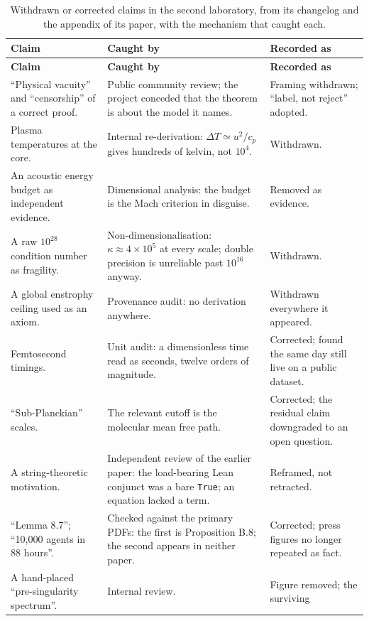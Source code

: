 \documentclass[11pt]{article}
\begin{document}
\begin{center}
\small
\begin{longtable}{@{}p{5.2cm}p{4.6cm}p{5.2cm}@{}}
\caption{Withdrawn or corrected claims in the second laboratory, from its changelog and the
appendix of its paper, with the mechanism that caught each.}\label{tab:sister}\\
\toprule
\textbf{Claim} & \textbf{Caught by} & \textbf{Recorded as} \\
\midrule
\endfirsthead
\toprule
\textbf{Claim} & \textbf{Caught by} & \textbf{Recorded as} \\
\midrule
\endhead
``Physical vacuity'' and ``censorship'' of a correct proof. & Public community review; the
project conceded that the theorem is about the model it names. & Framing withdrawn; ``label,
not reject'' adopted. \\
Plasma temperatures at the core. & Internal re-derivation: $\Delta T\simeq u^2/c_p$ gives
hundreds of kelvin, not $10^4$. & Withdrawn. \\
An acoustic energy budget as independent evidence. & Dimensional analysis: the budget is the
Mach criterion in disguise. & Removed as evidence. \\
A raw $10^{28}$ condition number as fragility. & Non-dimensionalisation: $\kappa\approx
4\times10^{5}$ at every scale; double precision is unreliable past $10^{16}$ anyway. &
Withdrawn. \\
A global enstrophy ceiling used as an axiom. & Provenance audit: no derivation anywhere. &
Withdrawn everywhere it appeared. \\
Femtosecond timings. & Unit audit: a dimensionless time read as seconds, twelve orders of
magnitude. & Corrected; found the same day still live on a public dataset. \\
``Sub-Planckian'' scales. & The relevant cutoff is the molecular mean free path. & Corrected;
the residual claim downgraded to an open question. \\
A string-theoretic motivation. & Independent review of the earlier paper: the load-bearing Lean
conjunct was a bare \texttt{True}; an equation lacked a term. & Reframed, not retracted. \\
``Lemma 8.7''; ``10{,}000 agents in 88 hours''. & Checked against the primary PDFs: the first
is Proposition B.8; the second appears in neither paper. & Corrected; press figures no longer
repeated as fact. \\
A hand-placed ``pre-singularity spectrum''. & Internal review. & Figure removed; the surviving

\end{longtable}
\end{center}
\end{document}
